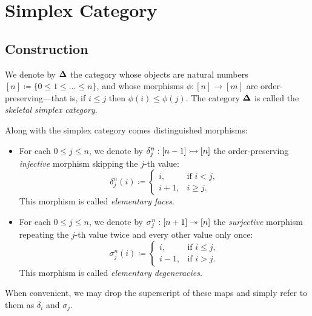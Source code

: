 \section{Simplex Category}

\subsection{Construction}

\begin{definition}
    \label{def:skeletal-simplex-category}
    We denote by \({\mathbf{\Delta}}\) the category whose objects are natural numbers
    \([n] \coloneq \{0 \leq 1 \leq \dots \leq n\}\), and whose morphisms
    \(\phi: [n] \to [m]\) are order-preserving---that is, if \(i \leq j\) then
    \(\phi(i) \leq \phi(j)\). The category \({\mathbf{\Delta}}\) is called the \emph{skeletal
        simplex category}.

    Along with the simplex category comes distinguished morphisms:
    \begin{itemize}\setlength\itemsep{0em}
        \item For each \(0 \leq j \leq n\), we denote by
              \(\delta_j^n: [n - 1] \rightarrowtail [n]\) the order-preserving \emph{injective}
              morphism skipping the \(j\)-th value:
              \[
                  \delta_j^n(i) \coloneq
                  \begin{cases}
                      i,     & \text{if } i < j, \\
                      i + 1, & i \geq j.
                  \end{cases}
              \]
              This morphism is called \emph{elementary faces}.

        \item For each \(0 \leq j \leq n\), we denote by
              \(\sigma_j^n: [n + 1] \twoheadrightarrow [n]\) the \emph{surjective} morphism repeating the
              \(j\)-th value twice and every other value only once:
              \[
                  \sigma_j^n(i) \coloneq
                  \begin{cases}
                      i,     & \text{if } i \leq j, \\
                      i - 1, & \text{if } i > j.
                  \end{cases}
              \]
              This morphism is called \emph{elementary degeneracies}.
    \end{itemize}
    When convenient, we may drop the superscript of these maps and simply refer to
    them as \(\delta_i\) and \(\sigma_j\).
\end{definition}

